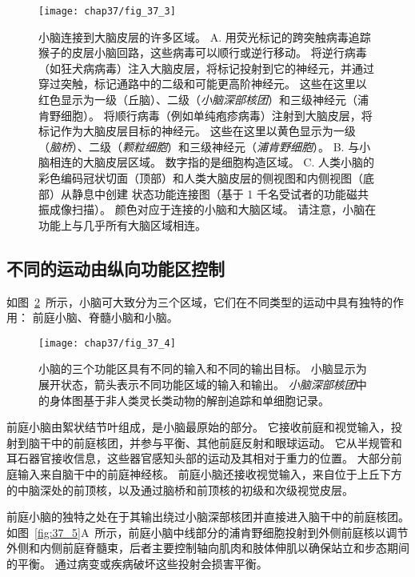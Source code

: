 \begin{figure}[htbp]
	\centering
	\texttt{[image: chap37/fig\_37\_3]}
	\caption{小脑连接到大脑皮层的许多区域\cite{bostan2013cerebellar}。
		A. 用荧光标记的跨突触病毒追踪猴子的皮层小脑回路，这些病毒可以顺行或逆行移动。
		将逆行病毒（如狂犬病病毒）注入大脑皮层，将标记投射到它的神经元，并通过穿过突触，标记通路中的二级和可能更高阶神经元。
		这些在这里以红色显示为一级（丘脑）、二级（\textit{小脑深部核团}）和三级神经元（浦肯野细胞）。
		将顺行病毒（例如单纯疱疹病毒）注射到大脑皮层，将标记作为大脑皮层目标的神经元。
		这些在这里以黄色显示为一级（\textit{脑桥}）、二级（\textit{颗粒细胞}）和三级神经元（\textit{浦肯野细胞}）。
		B. 与小脑相连的大脑皮层区域。 数字指的是细胞构造区域。
		C. 人类小脑的彩色编码冠状切面（顶部）和人类大脑皮层的侧视图和内侧视图（底部）从静息中创建 状态功能连接图（基于 1 千名受试者的功能磁共振成像扫描）。
		颜色对应于连接的小脑和大脑区域。
		请注意，小脑在功能上与几乎所有大脑区域相连。}
	\label{fig:37_3}
\end{figure}



\subsection{不同的运动由纵向功能区控制}

如图~\ref{fig:37_4}~所示，小脑可大致分为三个区域，它们在不同类型的运动中具有独特的作用：
前庭小脑、脊髓小脑和小脑。


\begin{figure}[htbp]
	\centering
	\texttt{[image: chap37/fig\_37\_4]}
	\caption{小脑的三个功能区具有不同的输入和不同的输出目标。
		小脑显示为展开状态，箭头表示不同功能区域的输入和输出。
		\textit{小脑深部核团}中的身体图基于非人类灵长类动物的解剖追踪和单细胞记录\cite{brooks1981handbook}。}
	\label{fig:37_4}
\end{figure}


前庭小脑由絮状结节叶组成，是小脑最原始的部分。
它接收前庭和视觉输入，投射到脑干中的前庭核团，并参与平衡、其他前庭反射和眼球运动。
它从半规管和耳石器官接收信息，这些器官感知头部的运动及其相对于重力的位置。
大部分前庭输入来自脑干中的前庭神经核。
前庭小脑还接收视觉输入，来自位于上丘下方的中脑深处的前顶核，以及通过脑桥和前顶核的初级和次级视觉皮层。


前庭小脑的独特之处在于其输出绕过小脑深部核团并直接进入脑干中的前庭核团。
如图~\ref{fig:37_5}A~所示，前庭小脑中线部分的浦肯野细胞投射到外侧前庭核以调节外侧和内侧前庭脊髓束，后者主要控制轴向肌肉和肢体伸肌以确保站立和步态期间的平衡。
通过病变或疾病破坏这些投射会损害平衡。


